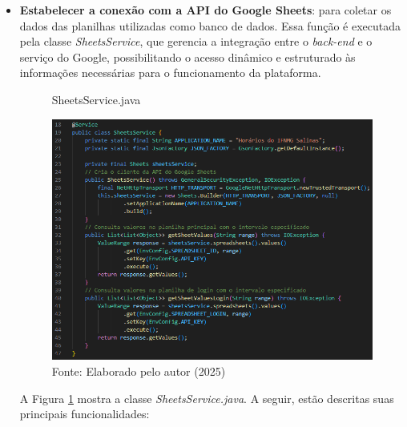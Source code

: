 \begin{itemize}
    \item \textbf{Estabelecer a conexão com a API do Google Sheets}: para coletar os dados das planilhas utilizadas como banco de dados. Essa função é executada pela classe \textit{SheetsService}, que gerencia a integração entre o \textit{back-end} e o serviço do Google, possibilitando o acesso dinâmico e estruturado às informações necessárias para o funcionamento da plataforma.
    
    \begin{figure}[H]
        \centering
        \caption{SheetsService.java}
        \includegraphics[width=1\textwidth]{Figuras/back-2.png}
        \caption*{Fonte: Elaborado pelo autor (2025)}
        \label{fig_back_2}
    \end{figure}
    
    A Figura \ref{fig_back_2} mostra a classe \textit{SheetsService.java}. A seguir, estão descritas suas principais funcionalidades:


\end{itemize}
